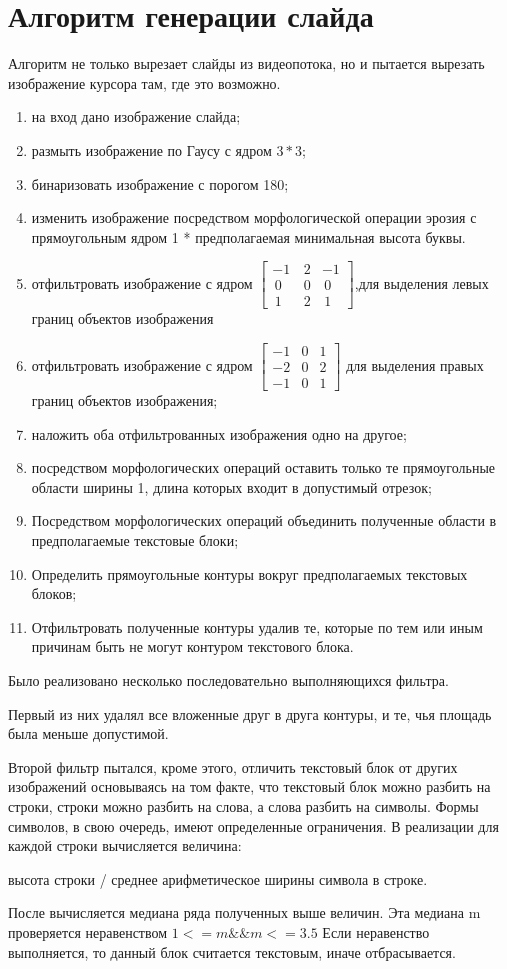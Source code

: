\documentclass[oneside,final,14pt]{extreport}
\begin{document}
\section{Алгоритм генерации слайда}
Алгоритм не только вырезает слайды из видеопотока, но и пытается вырезать изображение курсора там, где это возможно.
\begin{enumerate}
\item на вход дано изображение слайда;
\item размыть изображение по Гаусу с ядром $3*3$;
\item бинаризовать изображение с порогом 180;
\item изменить изображение посредством морфологической операции эрозия с прямоугольным ядром 1 * предполагаемая минимальная высота буквы. 
\item отфильтровать изображение с ядром  
$\begin{bmatrix}
 -1 & \,2 & -1 \\
\,0 & \,0 &\,0 \\
\,1 & \,2 &\,1
\end{bmatrix}$,для выделения левых границ объектов изображения
\item отфильтровать изображение с ядром 
$\begin{bmatrix}
-1 & 0 &  1 \\
-2 & 0 &  2 \\
-1 & 0 &  1
\end{bmatrix}$ для выделения правых границ объектов изображения;
\item наложить оба отфильтрованных изображения одно на другое;
\item посредством морфологических операций оставить только те прямоугольные области ширины 1, длина которых  входит в допустимый отрезок;
\item Посредством морфологических операций объединить полученные области в предполагаемые текстовые блоки;
\item Определить прямоугольные контуры вокруг предполагаемых текстовых блоков;
\item Отфильтровать полученные контуры удалив те, которые по тем или иным причинам быть не могут контуром текстового блока.
\end{enumerate}

Было реализовано несколько последовательно выполняющихся фильтра.

Первый из них удалял все вложенные друг в друга контуры, и те, чья площадь была меньше допустимой.

Второй фильтр пытался, кроме этого, отличить текстовый блок от других изображений основываясь на том факте, что текстовый блок можно разбить на строки, строки можно разбить на слова, а слова разбить на символы. Формы символов, в свою очередь, имеют определенные ограничения. В реализации для каждой строки вычисляется величина:
\begin{center}
высота строки / среднее арифметическое ширины символа в строке.
\end{center}
После вычисляется медиана ряда полученных выше величин. Эта медиана m проверяется неравенством
$1 <= m \&\& m <= 3.5$
Если неравенство выполняется, то данный блок считается текстовым, иначе отбрасывается. 
\end{document}
